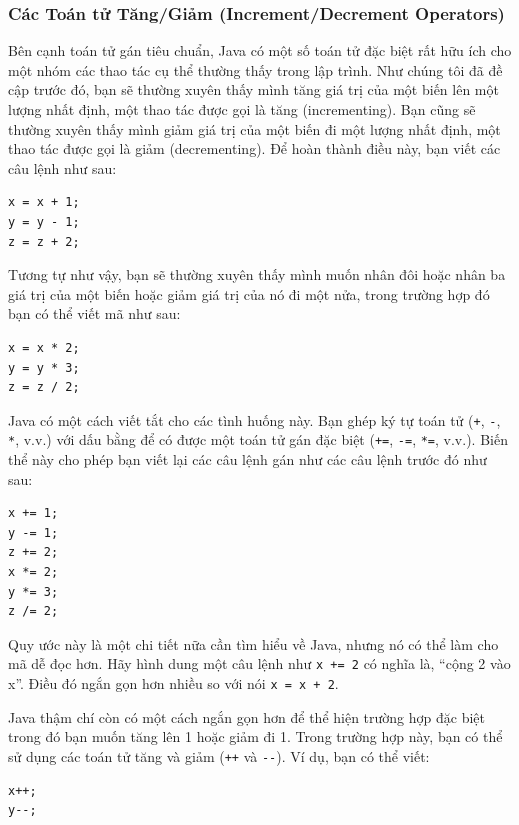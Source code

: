 \subsubsection{Các Toán tử Tăng/Giảm (Increment/Decrement
Operators)}\label{cuxe1c-touxe1n-tux1eed-tux103nggiux1ea3m-incrementdecrement-operators}

Bên cạnh toán tử gán tiêu chuẩn, Java có một số toán tử đặc biệt rất hữu
ích cho một nhóm các thao tác cụ thể thường thấy trong lập trình. Như
chúng tôi đã đề cập trước đó, bạn sẽ thường xuyên thấy mình tăng giá trị
của một biến lên một lượng nhất định, một thao tác được gọi là tăng
(incrementing). Bạn cũng sẽ thường xuyên thấy mình giảm giá trị của một
biến đi một lượng nhất định, một thao tác được gọi là giảm
(decrementing). Để hoàn thành điều này, bạn viết các câu lệnh như sau:

\begin{verbatim}
x = x + 1;
y = y - 1;
z = z + 2;
\end{verbatim}

Tương tự như vậy, bạn sẽ thường xuyên thấy mình muốn nhân đôi hoặc nhân
ba giá trị của một biến hoặc giảm giá trị của nó đi một nửa, trong
trường hợp đó bạn có thể viết mã như sau:

\begin{verbatim}
x = x * 2;
y = y * 3;
z = z / 2;
\end{verbatim}

Java có một cách viết tắt cho các tình huống này. Bạn ghép ký tự toán tử
(\texttt{+}, \texttt{-}, \texttt{*}, v.v.) với dấu bằng để có được một
toán tử gán đặc biệt (\texttt{+=}, \texttt{-=}, \texttt{*=}, v.v.). Biến
thể này cho phép bạn viết lại các câu lệnh gán như các câu lệnh trước đó
như sau:

\begin{verbatim}
x += 1;
y -= 1;
z += 2;
x *= 2;
y *= 3;
z /= 2;
\end{verbatim}

Quy ước này là một chi tiết nữa cần tìm hiểu về Java, nhưng nó có thể
làm cho mã dễ đọc hơn. Hãy hình dung một câu lệnh như \texttt{x\ +=\ 2}
có nghĩa là, ``cộng 2 vào x''. Điều đó ngắn gọn hơn nhiều so với nói
\texttt{x\ =\ x\ +\ 2}.

Java thậm chí còn có một cách ngắn gọn hơn để thể hiện trường hợp đặc
biệt trong đó bạn muốn tăng lên 1 hoặc giảm đi 1. Trong trường hợp này,
bạn có thể sử dụng các toán tử tăng và giảm (\texttt{++} và
\texttt{-\/-}). Ví dụ, bạn có thể viết:

\begin{verbatim}
x++;
y--;
\end{verbatim}

